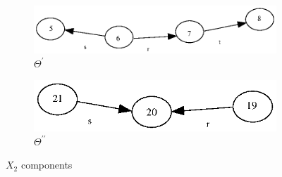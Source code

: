 \documentclass[a4paper,12pt]{article}
\numberwithin{equation}{section}
\numberwithin{figure}{section}
\begin{document}
\begin{figure}
\begin{center}
\begin{subfigure}[b]{.3\columnwidth}
\includegraphics[scale=0.5, bb=0 0  82 280]{python/ex_K_Y1.eps}
\caption{$\Theta^\prime$}
\label{fig:KY1}
\end{subfigure}
\hspace*{2cm}
\begin{subfigure}[b]{.3\columnwidth}
\includegraphics[scale=0.5, bb=0 0 82 210]{python/ex_K_Y2.eps}
\caption{$\Theta^{\prime\prime}$}
\label{fig:KY2}
\end{subfigure}
\end{center}
\caption{$X_2$ components}
\label{fig:KY}
\end{figure}
\end{document}
